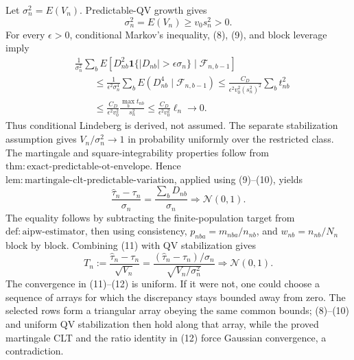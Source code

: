 Let \(\sigma_n^2=E(V_n)\). Predictable-QV growth gives
\[
\sigma_n^2=E(V_n)\ge v_0s_n^2>0.
\tag{9}
\]
For every \(\epsilon>0\), conditional Markov's inequality, (8), (9), and block leverage imply
\[
\begin{aligned}
&\frac1{\sigma_n^2}\sum_bE\left[D_{nb}^2\mathbf1\{|D_{nb}|>\epsilon\sigma_n\}
\mid\mathcal F_{n,b-1}\right]\\
&\qquad\le\frac1{\epsilon^2\sigma_n^4}\sum_bE(D_{nb}^4\mid\mathcal F_{n,b-1})
\le\frac{C_D}{\epsilon^2v_0^2(s_n^2)^2}\sum_bt_{nb}^2\\
&\qquad\le\frac{C_D}{\epsilon^2v_0^2}
\frac{\max_bt_{nb}}{s_n^2}
\le\frac{C_D}{\epsilon^2v_0^2}\ell_n\longrightarrow0.
\end{aligned}
\tag{10}
\]
Thus conditional Lindeberg is derived, not assumed. The separate stabilization assumption gives \(V_n/\sigma_n^2\to1\) in probability uniformly over the restricted class. The martingale and square-integrability properties follow from \(\mathrm{thm:exact\text{-}predictable\text{-}ot\text{-}envelope}\). Hence \(\mathrm{lem:martingale\text{-}clt\text{-}predictable\text{-}variation}\), applied using (9)--(10), yields
\[
\frac{\widehat\tau_n-\tau_n}{\sigma_n}
=\frac{\sum_bD_{nb}}{\sigma_n}\Rightarrow\mathcal N(0,1).
\tag{11}
\]
The equality follows by subtracting the finite-population target from \(\mathrm{def:aipw\text{-}estimator}\), then using consistency, \(p_{nba}=m_{nba}/n_{nb}\), and \(w_{nb}=n_{nb}/N_n\) block by block. Combining (11) with QV stabilization gives
\[
T_n:=\frac{\widehat\tau_n-\tau_n}{\sqrt{V_n}}
=\frac{(\widehat\tau_n-\tau_n)/\sigma_n}{\sqrt{V_n/\sigma_n^2}}
\Rightarrow\mathcal N(0,1).
\tag{12}
\]
The convergence in (11)--(12) is uniform. If it were not, one could choose a sequence of arrays for which the discrepancy stays bounded away from zero. The selected rows form a triangular array obeying the same common bounds; (8)--(10) and uniform QV stabilization then hold along that array, while the proved martingale CLT and the ratio identity in (12) force Gaussian convergence, a contradiction.

